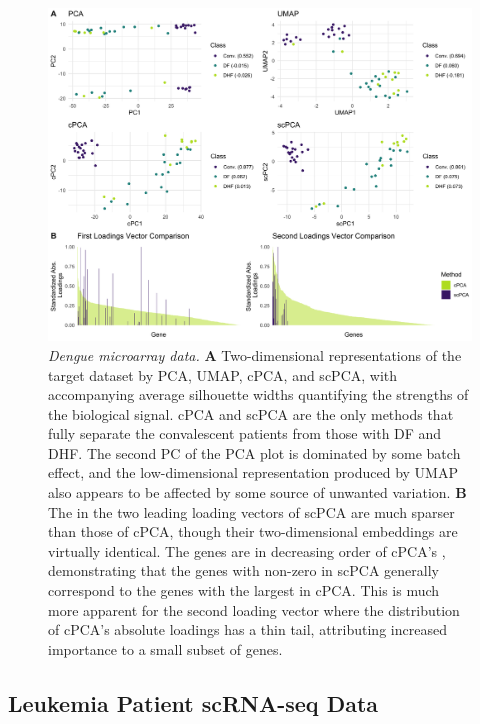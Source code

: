 \FloatBarrier
\begin{figure}[!htbp]
  \centering
  \includegraphics[width = \textwidth]{figures/dengue_results}
  \caption{
  {\em Dengue microarray data.}
  \textbf{A} Two-dimensional representations of the target dataset by PCA, UMAP, cPCA, and scPCA, with accompanying average silhouette widths quantifying the strengths of the biological signal.  cPCA and scPCA are the only methods that fully separate the convalescent patients from those with DF and DHF. The second PC of the PCA plot is dominated by some batch effect, and the low-dimensional representation produced by UMAP also appears to be affected by some source of unwanted variation. \textbf{B} The  in the two leading loading vectors of scPCA are much sparser than those of cPCA, though their two-dimensional embeddings are virtually identical. The genes are in decreasing order of cPCA's , demonstrating that the genes with non-zero  in scPCA generally correspond to the genes with the largest  in cPCA. This is much more apparent for the second loading vector where the distribution of cPCA's absolute loadings has a thin tail, attributing increased importance to a small subset of genes.}
  \label{fig:dengue}
\end{figure}

\subsection{Leukemia Patient scRNA-seq Data}\label{leukemia_data}

